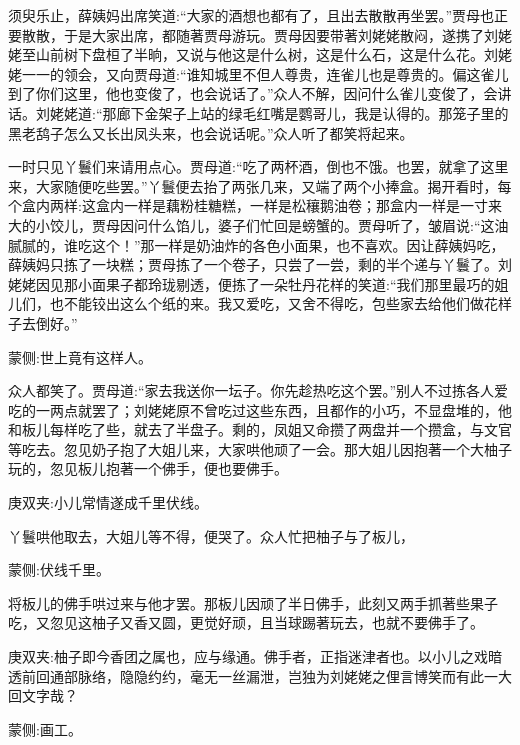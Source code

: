 \begin{parag}
    须臾乐止，薛姨妈出席笑道:“大家的酒想也都有了，且出去散散再坐罢。”贾母也正要散散，于是大家出席，都随著贾母游玩。贾母因要带著刘姥姥散闷，遂携了刘姥姥至山前树下盘桓了半晌，又说与他这是什么树，这是什么石，这是什么花。刘姥姥一一的领会，又向贾母道:“谁知城里不但人尊贵，连雀儿也是尊贵的。偏这雀儿到了你们这里，他也变俊了，也会说话了。”众人不解，因问什么雀儿变俊了，会讲话。刘姥姥道:“那廊下金架子上站的绿毛红嘴是鹦哥儿，我是认得的。那笼子里的黑老鸹子怎么又长出凤头来，也会说话呢。”众人听了都笑将起来。
\end{parag}


\begin{parag}
    一时只见丫鬟们来请用点心。贾母道:“吃了两杯酒，倒也不饿。也罢，就拿了这里来，大家随便吃些罢。”丫鬟便去抬了两张几来，又端了两个小捧盒。揭开看时，每个盒内两样:这盒内一样是藕粉桂糖糕，一样是松穰鹅油卷；那盒内一样是一寸来大的小饺儿，贾母因问什么馅儿，婆子们忙回是螃蟹的。贾母听了，皱眉说:“这油腻腻的，谁吃这个！”那一样是奶油炸的各色小面果，也不喜欢。因让薛姨妈吃，薛姨妈只拣了一块糕；贾母拣了一个卷子，只尝了一尝，剩的半个递与丫鬟了。刘姥姥因见那小面果子都玲珑剔透，便拣了一朵牡丹花样的笑道:“我们那里最巧的姐儿们，也不能铰出这么个纸的来。我又爱吃，又舍不得吃，包些家去给他们做花样子去倒好。”\begin{note}蒙侧:世上竟有这样人。\end{note}众人都笑了。贾母道:“家去我送你一坛子。你先趁热吃这个罢。”别人不过拣各人爱吃的一两点就罢了；刘姥姥原不曾吃过这些东西，且都作的小巧，不显盘堆的，他和板儿每样吃了些，就去了半盘子。剩的，凤姐又命攒了两盘并一个攒盒，与文官等吃去。忽见奶子抱了大姐儿来，大家哄他顽了一会。那大姐儿因抱著一个大柚子玩的，忽见板儿抱著一个佛手，便也要佛手。\begin{note}庚双夹:小儿常情遂成千里伏线。\end{note}丫鬟哄他取去，大姐儿等不得，便哭了。众人忙把柚子与了板儿，\begin{note}蒙侧:伏线千里。\end{note}将板儿的佛手哄过来与他才罢。那板儿因顽了半日佛手，此刻又两手抓著些果子吃，又忽见这柚子又香又圆，更觉好顽，且当球踢著玩去，也就不要佛手了。\begin{note}庚双夹:柚子即今香团之属也，应与缘通。佛手者，正指迷津者也。以小儿之戏暗透前回通部脉络，隐隐约约，毫无一丝漏泄，岂独为刘姥姥之俚言博笑而有此一大回文字哉？\end{note}\begin{note}蒙侧:画工。\end{note}
\end{parag}


